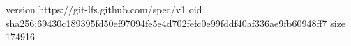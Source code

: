 version https://git-lfs.github.com/spec/v1
oid sha256:69430c189395fd50ef97094fe5e4d702fefc0e99fddf40af336ae9fb60948ff7
size 174916

